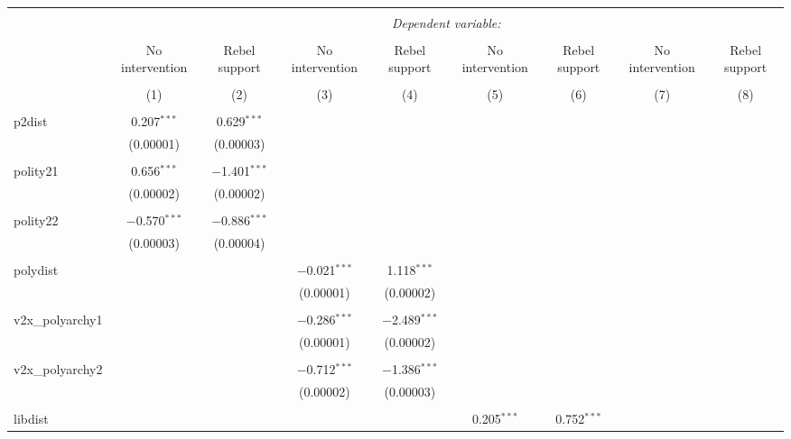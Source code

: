 
\begin{table}[!htbp] \centering 
  \caption{} 
  \label{} 
\begin{tabular}{@{\extracolsep{5pt}}lcccccccc} 
\\[-1.8ex]\hline 
\hline \\[-1.8ex] 
 & \multicolumn{8}{c}{\textit{Dependent variable:}} \\ 
\cline{2-9} 
\\[-1.8ex] & No intervention & Rebel support & No intervention & Rebel support & No intervention & Rebel support & No intervention & Rebel support \\ 
\\[-1.8ex] & (1) & (2) & (3) & (4) & (5) & (6) & (7) & (8)\\ 
\hline \\[-1.8ex] 
 p2dist & 0.207$^{***}$ & 0.629$^{***}$ &  &  &  &  &  &  \\ 
  & (0.00001) & (0.00003) &  &  &  &  &  &  \\ 
  & & & & & & & & \\ 
 polity21 & 0.656$^{***}$ & $-$1.401$^{***}$ &  &  &  &  &  &  \\ 
  & (0.00002) & (0.00002) &  &  &  &  &  &  \\ 
  & & & & & & & & \\ 
 polity22 & $-$0.570$^{***}$ & $-$0.886$^{***}$ &  &  &  &  &  &  \\ 
  & (0.00003) & (0.00004) &  &  &  &  &  &  \\ 
  & & & & & & & & \\ 
 polydist &  &  & $-$0.021$^{***}$ & 1.118$^{***}$ &  &  &  &  \\ 
  &  &  & (0.00001) & (0.00002) &  &  &  &  \\ 
  & & & & & & & & \\ 
 v2x\_polyarchy1 &  &  & $-$0.286$^{***}$ & $-$2.489$^{***}$ &  &  &  &  \\ 
  &  &  & (0.00001) & (0.00002) &  &  &  &  \\ 
  & & & & & & & & \\ 
 v2x\_polyarchy2 &  &  & $-$0.712$^{***}$ & $-$1.386$^{***}$ &  &  &  &  \\ 
  &  &  & (0.00002) & (0.00003) &  &  &  &  \\ 
  & & & & & & & & \\ 
 libdist &  &  &  &  & 0.205$^{***}$ & 0.752$^{***}$ &  &  \\ 

\end{tabular}
\end{table}
